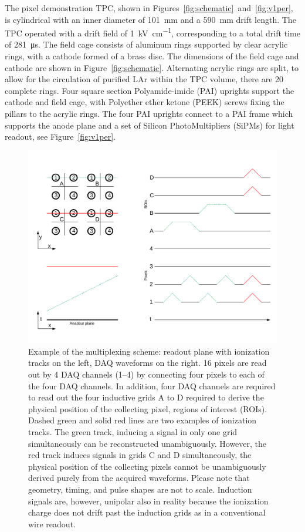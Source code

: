 \documentclass[instruments,article,accept,moreauthors,pdftex]{Definitions/mdpi}
\begin{document}
The pixel demonstration TPC, shown in Figures~\ref{fig:schematic}~and~\ref{fig:v1per}, is cylindrical with an inner diameter of \SI{101}{\milli\metre} and a \SI{590}{\milli\metre} drift length. 
The TPC operated with a drift field of \SI{1}{\kilo\volt\per\centi\metre}, corresponding to a total drift time of \SI{281}{\micro\second}. 
The field cage consists of aluminum rings supported by clear acrylic rings, with a cathode formed of a brass disc. 
The dimensions of the field cage and cathode are shown in Figure~\ref{fig:schematic}.
Alternating acrylic rings are split, to allow for the circulation of purified LAr within the TPC volume, there are 20 complete rings.
Four square section Polyamide-imide (PAI) uprights support the cathode and field cage, with  Polyether ether ketone (PEEK) screws fixing the pillars to the acrylic rings.
The four PAI uprights connect to a PAI frame which supports the anode plane and a set of  Silicon PhotoMultipliers (SiPMs) for light readout, see Figure~\ref{fig:v1per}. 

\begin{figure}[H]
	\centering
	\includegraphics[width=\textwidth]{Figures/mux}
	\caption{Example of the multiplexing scheme: readout plane with ionization tracks on the left, DAQ waveforms on the right. 16 pixels are read out by 4 DAQ channels (\numrange{1}{4}) by connecting four pixels to each of the four DAQ channels. In addition, four DAQ channels are required to read out the four inductive grids A to D required to derive the physical position of the collecting pixel, regions of interest (ROIs). Dashed green and solid red lines are two examples of ionization tracks. The green track, inducing a signal in only one grid simultaneously can be reconstructed unambiguously. However, the red track induces signals in grids C and D simultaneously, the physical position of the collecting pixels cannot be unambiguously derived purely from the acquired waveforms. Please note that geometry, timing, and pulse shapes are not to scale. Induction signals are, however, unipolar also in reality because the ionization charge does not drift past the induction grids as in a conventional wire readout.}
	\label{fig:mux}
\end{figure}
\end{document}
